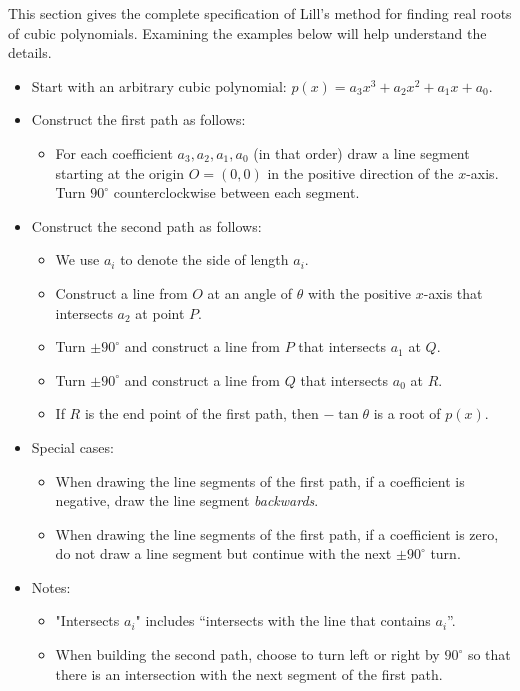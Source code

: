 This section gives the complete specification of Lill's method for finding real roots of cubic polynomials. Examining the examples below will help understand the details.
\begin{itemize}
\item Start with an arbitrary cubic polynomial: $p(x)=a_3x^3+a_2x^2+a_1x+a_0$.
\item Construct the first path as follows:
\begin{itemize}
\item For each coefficient $a_3,a_2,a_1,a_0$ (in that order) draw a line segment starting at the origin $O=(0,0)$ in the positive direction of the $x$-axis. Turn $90^\circ$ counterclockwise between each segment.
\end{itemize}
\item Construct the second path as follows:
\begin{itemize}
\item We use $a_i$ to denote the side of length $a_i$.
\item Construct a line from $O$ at an angle of $\theta$ with the positive $x$-axis that intersects $a_2$ at point $P$.
\item Turn $\pm 90^\circ$ and construct a line from $P$ that intersects $a_1$ at $Q$.
\item Turn $\pm 90^\circ$ and construct a line from $Q$ that intersects $a_0$ at $R$.
\item If $R$ is the end point of the first path, then $-\tan\theta$ is a root of $p(x)$.
\end{itemize}
\item Special cases:
\begin{itemize}
\item When drawing the line segments of the first path, if a coefficient is negative, draw the line segment \emph{backwards}.
\item When drawing the line segments of the first path, if a coefficient is zero, do not draw a line segment but continue with the next $\pm90^\circ$ turn.
\end{itemize}
\item Notes:
\begin{itemize}
\item "Intersects $a_i$" includes ``intersects with the line that contains $a_i$''.
\item When building the second path, choose to turn left or right by $90^\circ$ so that there is an intersection with the next segment of the first path.
\end{itemize}
\end{itemize}


